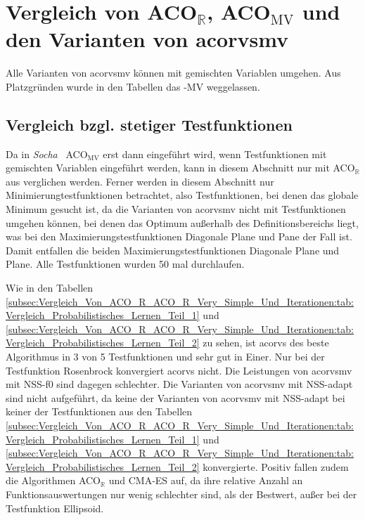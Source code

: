 \documentclass[fontsize=12, a4aper]{scrartcl}
\begin{document}
	\section{Vergleich von ACO\(_{\mathbb{R}}\), ACO\(_\text{MV}\) und den Varianten von \acl{acorvsmv}} \label{sec:Vergleich_Von_ACO_R_ACO_R_Very_Simple_Und_Den_Iterationen_Von_ACO_R_Very_Simple}
	
	Alle Varianten von \ac{acorvsmv} können mit gemischten Variablen umgehen. Aus Platzgründen wurde in den Tabellen das \glqq -MV\grqq{} weggelassen.
	
	\subsection{Vergleich bzgl. stetiger Testfunktionen} \label{subsec:Vergleich_Algorithmen:Vergleich_Auf_Stetigen_Testfunktionen}
	
	Da in \textit{Socha}~\cite{socha2009ant} ACO\(_\text{MV}\) erst dann eingeführt wird, wenn Testfunktionen mit gemischten Variablen eingeführt werden, kann in diesem Abschnitt nur mit ACO\(_\mathbb{R}\) aus \cite{socha2009ant} verglichen werden. Ferner werden in diesem Abschnitt nur Minimierungtestfunktionen betrachtet, also Testfunktionen, bei denen das globale Minimum gesucht ist, da die Varianten von \ac{acorvsmv} nicht mit Testfunktionen umgehen können, bei denen das Optimum außerhalb des Definitionsbereichs liegt, was bei den Maximierungstestfunktionen \glqq Diagonale Plane\grqq{} und \glqq Pane\grqq{} der Fall ist. Damit entfallen die beiden Maximierungstestfunktionen \glqq Diagonale Plane\grqq{} und \glqq Plane\grqq. Alle Testfunktionen wurden 50 mal durchlaufen.\hfill\newline
	
	Wie in den Tabellen \ref{subsec:Vergleich_Von_ACO_R_ACO_R_Very_Simple_Und_Iterationen:tab:Vergleich_Probabilistisches_Lernen_Teil_1} und \ref{subsec:Vergleich_Von_ACO_R_ACO_R_Very_Simple_Und_Iterationen:tab:Vergleich_Probabilistisches_Lernen_Teil_2} zu sehen, ist \ac{acorvs} des beste Algorithmus in 3 von 5 Testfunktionen und sehr gut in Einer. Nur bei der Testfunktion \glqq Rosenbrock\grqq{} konvergiert \ac{acorvs} nicht. Die Leistungen von \ac{acorvsmv} mit NSS-f0 sind dagegen schlechter. Die Varianten von \ac{acorvsmv} mit NSS-adapt sind nicht aufgeführt, da keine der Varianten von \ac{acorvsmv} mit NSS-adapt bei keiner der Testfunktionen aus den Tabellen \ref{subsec:Vergleich_Von_ACO_R_ACO_R_Very_Simple_Und_Iterationen:tab:Vergleich_Probabilistisches_Lernen_Teil_1} und \ref{subsec:Vergleich_Von_ACO_R_ACO_R_Very_Simple_Und_Iterationen:tab:Vergleich_Probabilistisches_Lernen_Teil_2} konvergierte. Positiv fallen zudem die Algorithmen ACO\(_\mathbb{R}\) und CMA-ES auf, da ihre relative Anzahl an Funktionsauswertungen nur wenig schlechter sind, als der Bestwert, außer bei der Testfunktion \glqq Ellipsoid\grqq.\hfill\newline
	
\end{document}
